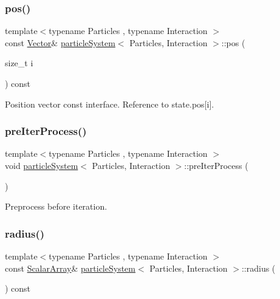 \subsubsection{\texorpdfstring{pos()}{pos()}\hspace{0.1cm}{\footnotesize\ttfamily [2/2]}}
{\footnotesize\ttfamily template$<$typename Particles , typename Interaction $>$ \\
const \mbox{\hyperlink{classparticle_system_a76c99c2b05db108a24c6e6ccbbd93af1}{Vector}}\& \mbox{\hyperlink{classparticle_system}{particle\+System}}$<$ Particles, Interaction $>$\+::pos (\begin{DoxyParamCaption}\item[{size\+\_\+t}]{i }\end{DoxyParamCaption}) const\hspace{0.3cm}{\ttfamily [inline]}}



Position vector const interface. Reference to state.\+pos\mbox{[}i\mbox{]}. 

\mbox{\label{classparticle_system_a14ee76644ab1bacc3ed4a66e4fff0fb1}} 
\subsubsection{\texorpdfstring{pre\+Iter\+Process()}{preIterProcess()}}
{\footnotesize\ttfamily template$<$typename Particles , typename Interaction $>$ \\
void \mbox{\hyperlink{classparticle_system}{particle\+System}}$<$ Particles, Interaction $>$\+::pre\+Iter\+Process (\begin{DoxyParamCaption}{ }\end{DoxyParamCaption})\hspace{0.3cm}{\ttfamily [inline]}}



Preprocess before iteration. 

\mbox{\label{classparticle_system_aed99ea79678f0233119ebc28d2b9822d}} 
\subsubsection{\texorpdfstring{radius()}{radius()}\hspace{0.1cm}{\footnotesize\ttfamily [1/2]}}
{\footnotesize\ttfamily template$<$typename Particles , typename Interaction $>$ \\
const \mbox{\hyperlink{classparticle_system_a7f143d2466bd0f78d79cccd3493a756b}{Scalar\+Array}}\& \mbox{\hyperlink{classparticle_system}{particle\+System}}$<$ Particles, Interaction $>$\+::radius (\begin{DoxyParamCaption}{ }\end{DoxyParamCaption}) const\hspace{0.3cm}{\ttfamily [inline]}}



